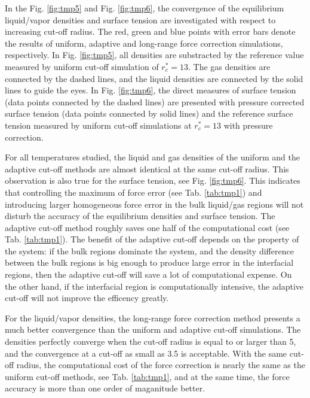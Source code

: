 \documentclass[aps,pre,preprint]{revtex4}
\begin{document}
In the Fig. \ref{fig:tmp5} and Fig. \ref{fig:tmp6}, the convergence of
the equilibrium liquid/vapor densities and surface tension are
investigated with respect to increasing cut-off radius. The red, green
and blue points with error bars denote the results of uniform,
adaptive and long-range force correction simulations, respectively.
In Fig. \ref{fig:tmp5}, all densities are substracted by the reference
value measured by uniform cut-off simulation of $r_c^\ast = 13$.  The
gas densities are connected by the dashed lines, and the liquid
densities are connected by the solid lines to guide the eyes.  In
Fig. \ref{fig:tmp6}, the direct measures of surface tension (data
points connected by the dashed lines) are presented with pressure
corrected surface tension (data points connected by solid lines) and
the reference surface tension measured by uniform cut-off simulations
at $r_c^\ast = 13$ with pressure correction.


For all temperatures studied, the liquid and gas densities of the
uniform and the adaptive cut-off methods are almost identical at the
same cut-off radius. This observation is also true for the surface
tension, see Fig. \ref{fig:tmp6}. This indicates that controlling the
maximum of force error (see Tab. \ref{tab:tmp1}) and introducing
larger homogeneous force error in the bulk liquid/gas regions will not
disturb the accuracy of the equilibrium densities and surface tension.
The adaptive cut-off method roughly saves one half of the
computational cost (see Tab. \ref{tab:tmp1}). The benefit of the
adaptive cut-off depends on the property of the system: if the bulk
regions dominate the system, and the density difference between the
bulk regions is big enough to produce large error in the interfacial regions,
then the adaptive cut-off will save a lot of
computational expense. On the other hand, if the interfacial region is
computationally intensive, the adaptive cut-off will not improve the efficency
greatly.

For the liquid/vapor densities, the long-range force correction method
presents a much better convergence than the uniform and adaptive
cut-off simulations. The densities perfectly converge when the cut-off
radius is equal to or larger than 5, and the convergence at a cut-off
as small as 3.5 is acceptable.  With the same cut-off radius, the
computational cost of the force correction is nearly the same as the
uniform cut-off methods, see Tab. \ref{tab:tmp1}, and at the same
time, the force accuracy is more than one order of maganitude better.
\end{document}
